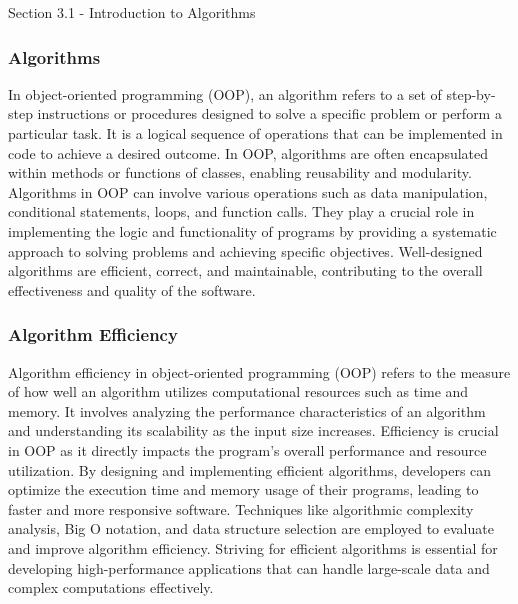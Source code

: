 \begin{notes}{Section 3.1 - Introduction to Algorithms}
    \subsubsection*{Algorithms}

    In object-oriented programming (OOP), an algorithm refers to a set of step-by-step instructions or procedures designed to solve a specific problem or perform a particular task. It is a logical sequence of operations that can be implemented in code to achieve a desired outcome. In OOP, algorithms are often encapsulated within 
    methods or functions of classes, enabling reusability and modularity. Algorithms in OOP can involve various operations such as data manipulation, conditional statements, loops, and function calls. They play a crucial role in implementing the logic and functionality of programs by providing a systematic approach to solving problems 
    and achieving specific objectives. Well-designed algorithms are efficient, correct, and maintainable, contributing to the overall effectiveness and quality of the software.
    
    \subsubsection*{Algorithm Efficiency}
    
    Algorithm efficiency in object-oriented programming (OOP) refers to the measure of how well an algorithm utilizes computational resources such as time and memory. It involves analyzing the performance characteristics of an algorithm and understanding its scalability as the input size increases. Efficiency is crucial in OOP as it 
    directly impacts the program's overall performance and resource utilization. By designing and implementing efficient algorithms, developers can optimize the execution time and memory usage of their programs, leading to faster and more responsive software. Techniques like algorithmic complexity analysis, Big O notation, and data 
    structure selection are employed to evaluate and improve algorithm efficiency. Striving for efficient algorithms is essential for developing high-performance applications that can handle large-scale data and complex computations effectively.
    

\end{notes}
